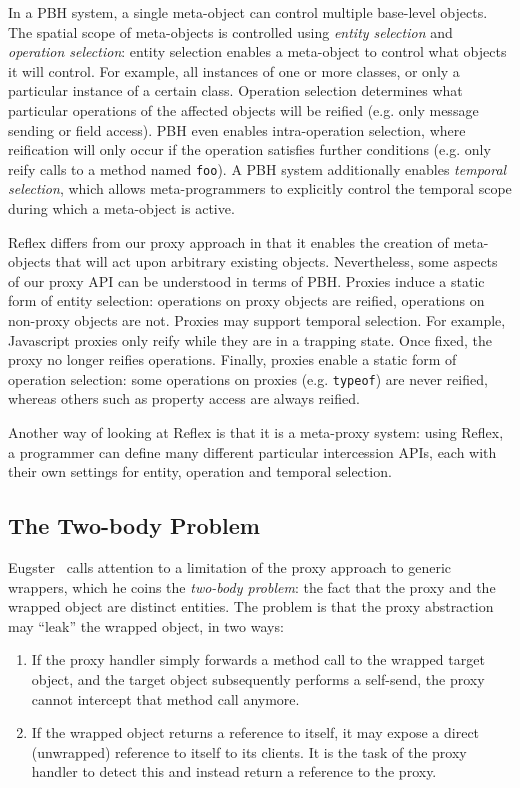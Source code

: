 \documentclass{acm_proc_article-sp}
\begin{document}
In a PBH system, a single meta-object can control multiple base-level objects. The spatial scope of meta-objects is controlled using \emph{entity selection} and \emph{operation selection}: entity selection enables a meta-object to control what objects it will control. For example, all instances of one or more classes, or only a particular instance of a certain class. Operation selection determines what particular operations of the affected objects will be reified (e.g. only message sending or field access). PBH even enables intra-operation selection, where reification will only occur if the operation satisfies further conditions (e.g. only reify calls to a method named \texttt{foo}). A PBH system additionally enables \emph{temporal selection}, which allows meta-programmers to explicitly control the temporal scope during which a meta-object is active.

Reflex differs from our proxy approach in that it enables the creation of meta-objects that will act upon arbitrary existing objects. Nevertheless, some aspects of our proxy API can be understood in terms of PBH. Proxies induce a static form of entity selection: operations on proxy objects are reified, operations on non-proxy objects are not. Proxies may support temporal selection. For example, Javascript proxies only reify while they are in a trapping state. Once fixed, the proxy no longer reifies operations. Finally, proxies enable a static form of operation selection: some operations on proxies (e.g. \texttt{typeof}) are never reified, whereas others such as property access are always reified.

Another way of looking at Reflex is that it is a meta-proxy system: using Reflex, a programmer can define many different particular intercession APIs, each with their own settings for entity, operation and temporal selection.

\subsection{The Two-body Problem}

Eugster~\cite{eugster06uniform} calls attention to a limitation of the proxy approach to generic wrappers, which he coins the \emph{two-body problem}: the fact that the proxy and the wrapped object are distinct entities. The problem is that the proxy abstraction may ``leak'' the wrapped object, in two ways:
\begin{enumerate}
  \item If the proxy handler simply forwards a method call to the wrapped target object, and the target object subsequently performs a self-send, the proxy cannot intercept that method call anymore.
  \item If the wrapped object returns a reference to itself, it may expose a direct (unwrapped) reference to itself to its clients. It is the task of the proxy handler to detect this and instead return a reference to the proxy.
\end{enumerate}
\end{document}
